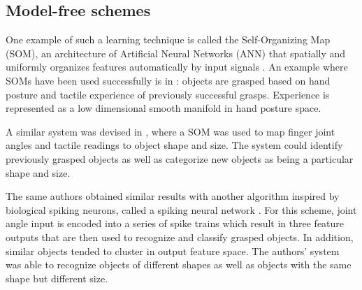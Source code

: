 \subsection{Model-free schemes}


One example of such a learning technique is called the Self-Organizing Map (SOM), an architecture of Artificial Neural Networks (ANN) that spatially and uniformly organizes features automatically by input signals \cite{kohonen1990self}.
An example where SOMs have been used successfully is in \cite{steffen2007experience}: objects are grasped based on hand posture and tactile experience of previously successful grasps.
Experience is represented as a low dimensional smooth manifold in hand posture space. 

A similar system was devised in \cite{ratnasingam2011object}, where a SOM was used to map finger joint angles and tactile readings to object shape and size.
The system could identify previously grasped objects as well as categorize new objects as being a particular shape and size.

The same authors obtained similar results with another algorithm inspired by biological spiking neurons, called a spiking neural network \cite{ratnasingam2011spiking}.
For this scheme, joint angle input is encoded into a series of spike trains which result in three feature outputs that are then used to recognize and classify grasped objects.
In addition, similar objects tended to cluster in output feature space.
The authors' system was able to recognize objects of different shapes as well as objects with the same shape but different size.

